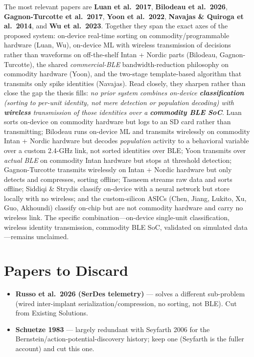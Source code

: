 \documentclass[11pt]{article}
\begin{document}
The most relevant papers are \textbf{Luan et al.\ 2017}, \textbf{Bilodeau et al.\ 2026}, \textbf{Gagnon-Turcotte et al.\ 2017}, \textbf{Yoon et al.\ 2022}, \textbf{Navajas \& Quiroga et al.\ 2014}, and \textbf{Wu et al.\ 2023}. Together they span the exact axes of the proposed system: on-device real-time sorting on commodity/programmable hardware (Luan, Wu), on-device ML with wireless transmission of decisions rather than waveforms on off-the-shelf Intan + Nordic parts (Bilodeau, Gagnon-Turcotte), the shared \emph{commercial-BLE} bandwidth-reduction philosophy on commodity hardware (Yoon), and the two-stage template-based algorithm that transmits only spike identities (Navajas). Read closely, they sharpen rather than close the gap the thesis fills: \emph{no prior system combines on-device \textbf{classification} (sorting to per-unit identity, not mere detection or population decoding) with \textbf{wireless} transmission of those identities over a \textbf{commodity BLE SoC}}. Luan sorts on-device on commodity hardware but logs to an SD card rather than transmitting; Bilodeau runs on-device ML and transmits wirelessly on commodity Intan + Nordic hardware but decodes \emph{population} activity to a behavioral variable over a custom 2.4-GHz link, not sorted identities over BLE; Yoon transmits over \emph{actual BLE} on commodity Intan hardware but stops at threshold detection; Gagnon-Turcotte transmits wirelessly on Intan + Nordic hardware but only detects and compresses, sorting offline; Tasneem streams raw data and sorts offline; Siddiqi \& Strydis classify on-device with a neural network but store locally with no wireless; and the custom-silicon ASICs (Chen, Jiang, Lukito, Xu, Guo, Akhoundi) classify on-chip but are not commodity hardware and carry no wireless link. The specific combination---on-device single-unit classification, wireless identity transmission, commodity BLE SoC, validated on simulated data---remains unclaimed.

\section*{Papers to Discard}

\begin{itemize}[nosep]
\item \textbf{Russo et al.\ 2026 (SerDes telemetry)} --- solves a different sub-problem (wired inter-implant serialization/compression, no sorting, not BLE). Cut from Existing Solutions.
\item \textbf{Schuetze 1983} --- largely redundant with Seyfarth 2006 for the Bernstein/action-potential-discovery history; keep one (Seyfarth is the fuller account) and cut this one.
\end{itemize}
\end{document}
